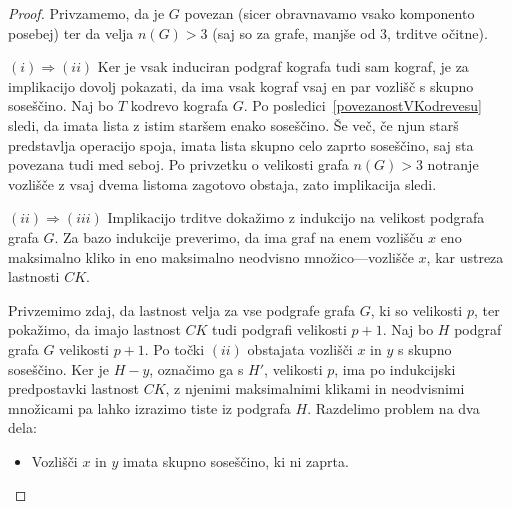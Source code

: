 \documentclass[12pt,a4paper,twoside]{article}
\theoremstyle{definition} %
\theoremstyle{plain} %
\numberwithin{equation}{section}  %
\begin{document}
\begin{proof}
Privzamemo, da je $G$ povezan (sicer obravnavamo vsako komponento posebej) ter da velja $n(G) > 3$ (saj so za grafe, manjše od 3, trditve očitne). 

\medskip
$(i) \Rightarrow (ii)$ Ker je vsak induciran podgraf kografa tudi sam kograf, je za implikacijo dovolj pokazati, da ima vsak kograf vsaj en par vozlišč s skupno soseščino. Naj bo $T$ kodrevo kografa $G$. Po posledici~\ref{povezanostVKodrevesu} sledi, da imata lista z istim staršem enako soseščino. Še več, če njun starš predstavlja operacijo spoja, imata lista skupno celo zaprto soseščino, saj sta povezana tudi med seboj. Po privzetku o velikosti grafa $n(G) > 3$ notranje vozlišče z vsaj dvema listoma zagotovo obstaja, zato implikacija sledi.

\medskip
$(ii) \Rightarrow (iii)$ Implikacijo trditve dokažimo z indukcijo na velikost podgrafa grafa $G$. Za bazo indukcije preverimo, da ima graf na enem vozlišču $x$ eno maksimalno kliko in eno maksimalno neodvisno množico---vozlišče $x$, kar ustreza lastnosti $CK$.

Privzemimo zdaj, da lastnost velja za vse podgrafe grafa $G$, ki so velikosti $p$, ter pokažimo, da imajo lastnost $CK$ tudi podgrafi velikosti $p+1$. Naj bo $H$ podgraf grafa $G$ velikosti $p+1$. Po točki $(ii)$ obstajata vozlišči $x$ in $y$ s skupno soseščino. Ker je $H - y$, označimo ga s $H'$, velikosti $p$, ima po indukcijski predpostavki lastnost $CK$, z njenimi maksimalnimi klikami in neodvisnimi množicami pa lahko izrazimo tiste iz podgrafa $H$.
Razdelimo problem na dva dela:
\begin{itemize}
\item Vozlišči $x$ in $y$ imata skupno soseščino, ki ni zaprta.


\end{itemize}
\end{proof}
\end{document}
